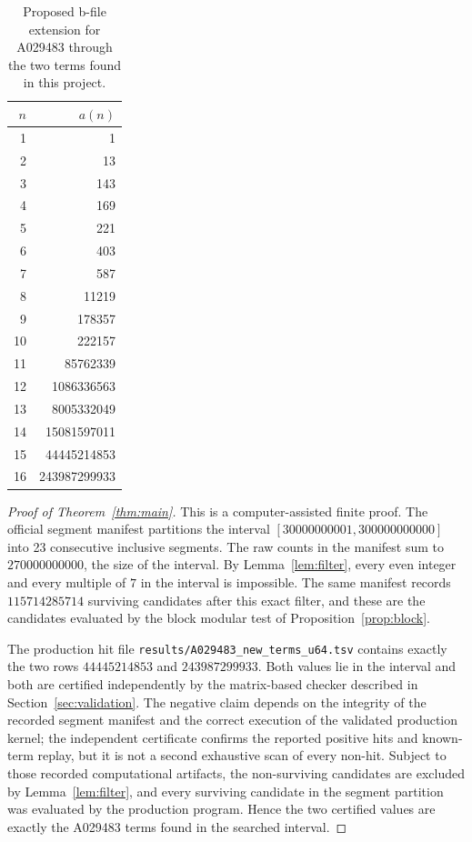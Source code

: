 \documentclass[11pt]{article}
\theoremstyle{definition}
\theoremstyle{remark}
\begin{document}
\begin{table}[ht]
\centering
\begin{tabular}{rr}
\toprule
\(n\) & \(a(n)\)\\
\midrule
1 & 1\\
2 & 13\\
3 & 143\\
4 & 169\\
5 & 221\\
6 & 403\\
7 & 587\\
8 & 11219\\
9 & 178357\\
10 & 222157\\
11 & 85762339\\
12 & 1086336563\\
13 & 8005332049\\
14 & 15081597011\\
15 & 44445214853\\
16 & 243987299933\\
\bottomrule
\end{tabular}
\caption{Proposed b-file extension for A029483 through the two terms found
in this project.}
\label{tab:bfile}
\end{table}

\begin{proof}[Proof of Theorem~\ref{thm:main}]
This is a computer-assisted finite proof.  The official segment manifest
partitions the interval \([30000000001,300000000000]\) into 23 consecutive
inclusive segments.  The raw counts in the manifest sum to \(270000000000\),
the size of the interval.
By Lemma~\ref{lem:filter}, every even integer and every multiple of \(7\) in
the interval is impossible.  The same manifest records
\(115714285714\) surviving candidates after this exact filter, and these are
the candidates evaluated by the block modular test of
Proposition~\ref{prop:block}.

The production hit file \texttt{results/A029483\_new\_terms\_u64.tsv}
contains exactly the two rows \(44445214853\) and \(243987299933\).  Both
values lie in the interval and both are certified independently by the
matrix-based checker described in Section~\ref{sec:validation}.  The negative
claim depends on the integrity of the recorded segment manifest and the
correct execution of the validated production kernel; the independent
certificate confirms the reported positive hits and known-term replay, but it
is not a second exhaustive scan of every non-hit.  Subject to those recorded
computational artifacts, the non-surviving candidates are excluded by
Lemma~\ref{lem:filter}, and every surviving candidate in the segment
partition was evaluated by the production program.  Hence the two certified
values are exactly the A029483 terms found in the searched interval.
\end{proof}
\end{document}
